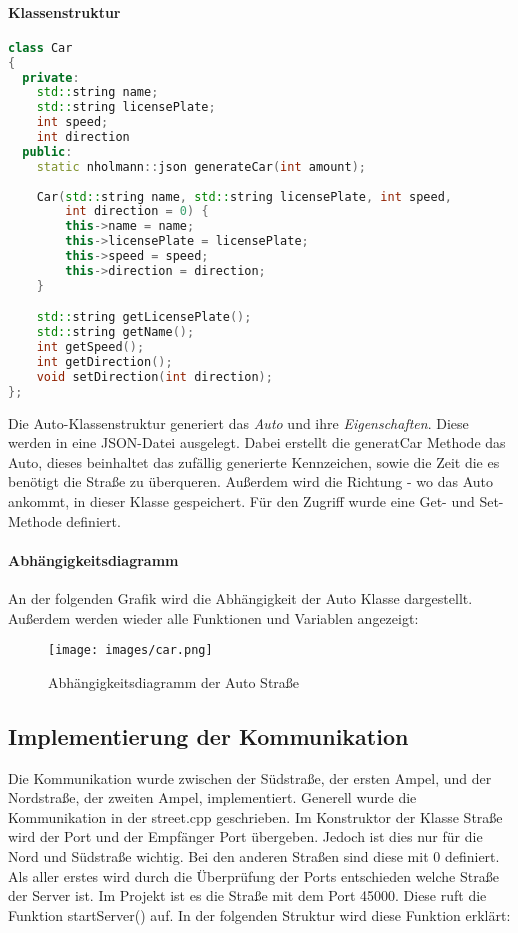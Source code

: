 \documentclass[12pt, oneside]{article}
\begin{document}
\paragraph{Klassenstruktur}
\begin{lstlisting}[language=C++, caption={C++ car.h - Klassenstruktur}]
class Car
{
  private:
    std::string name;
    std::string licensePlate;
    int speed;
    int direction
  public:
    static nholmann::json generateCar(int amount);
    
    Car(std::string name, std::string licensePlate, int speed, 
        int direction = 0) {
        this->name = name;
        this->licensePlate = licensePlate;
        this->speed = speed;
        this->direction = direction;
    }

    std::string getLicensePlate();
    std::string getName();
    int getSpeed();
    int getDirection();
    void setDirection(int direction);
};
\end{lstlisting}
 Die Auto-Klassenstruktur generiert das \emph{Auto} und ihre \emph{Eigenschaften}. Diese werden in eine JSON-Datei ausgelegt. Dabei erstellt die generatCar Methode das Auto, dieses beinhaltet das zufällig generierte Kennzeichen, sowie die Zeit die es benötigt die Straße zu überqueren. Außerdem wird die Richtung - wo das Auto ankommt, in dieser Klasse gespeichert. Für den Zugriff wurde eine Get- und Set-Methode definiert.
 
\paragraph{Abhängigkeitsdiagramm} 
An der folgenden Grafik wird die Abhängigkeit der Auto Klasse dargestellt. Außerdem werden wieder alle Funktionen und Variablen angezeigt: 

\begin{figure}[H]
    \centering
    \texttt{[image: images/car.png]} 
    \caption{Abhängigkeitsdiagramm der Auto Straße}
    \label{fig:car}
\end{figure}

\subsection{Implementierung der Kommunikation}
\label{Kommunikation}
Die Kommunikation wurde zwischen der Südstraße, der ersten Ampel, und der Nordstraße, der zweiten Ampel, implementiert. Generell wurde die Kommunikation in der street.cpp geschrieben. Im Konstruktor der Klasse Straße wird der Port und der Empfänger Port übergeben. Jedoch ist dies nur für die Nord und Südstraße wichtig. Bei den anderen Straßen sind diese mit 0 definiert. Als aller erstes wird durch die Überprüfung der Ports entschieden welche Straße der Server ist. Im Projekt ist es die Straße mit dem Port 45000. Diese ruft die Funktion startServer() auf. In der folgenden Struktur wird diese Funktion erklärt:
\end{document}

